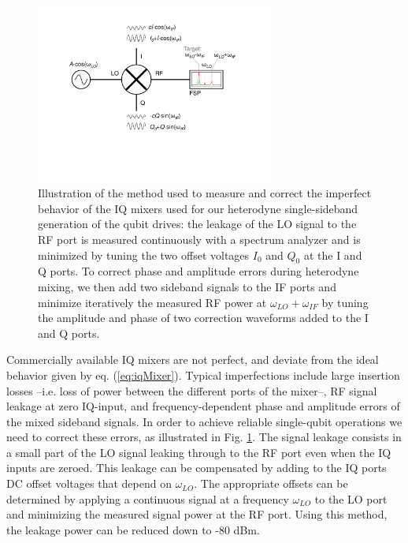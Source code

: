 \begin{figure}[ht!]
	\centering
		\includegraphics[width=0.7\textwidth]{"./material/figures/measurement/mixer_imperfections"}
	\caption[...]{Illustration of the method used to measure and correct the imperfect behavior of the IQ mixers used for  our heterodyne single-sideband generation of the qubit drives: the leakage of the LO signal to the RF port is measured continuously with a spectrum analyzer and is minimized by tuning the two offset voltages $I_0$ and $Q_0$ at the I and Q ports. To correct phase and amplitude errors during heterodyne mixing, we then add two sideband signals to the IF ports and minimize iteratively the measured RF power at $\omega_{LO}+\omega_{IF}$ by tuning the amplitude and phase of two correction waveforms added to the I and Q ports.}
	\label{fig:iq_mixer_correction}
\end{figure}

Commercially available IQ mixers are not perfect, and deviate from the ideal behavior given by eq. (\ref{eq:iqMixer}). Typical imperfections include large insertion losses --i.e. loss of  power between the different ports of the mixer--, RF signal leakage at zero IQ-input, and frequency-dependent phase and amplitude errors of the mixed sideband signals. In order to achieve reliable single-qubit operations we need to correct these errors, as illustrated in Fig. \ref{fig:iq_mixer_correction}. The signal leakage consists in a small part of the LO signal leaking through to the RF port even when the IQ inputs are zeroed. This leakage can be compensated by adding to the IQ ports DC offset voltages that depend on $\omega_{LO}$. The appropriate offsets can be determined by applying a continuous signal at a frequency $\omega_{LO}$ to the LO port and minimizing the measured signal power at the RF port. Using this method, the leakage power can be reduced down to -80 dBm.

